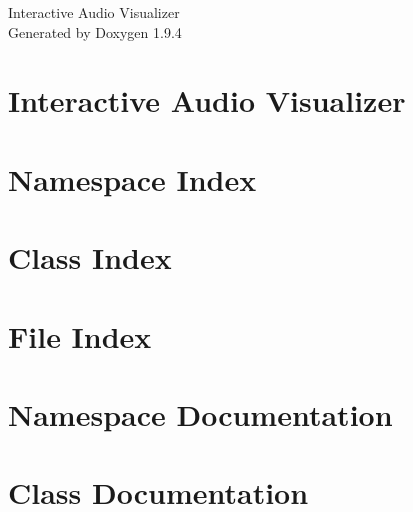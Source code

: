 \documentclass[twoside]{book}
\newcommand{\+}{\discretionary{\mbox{\scriptsize$\hookleftarrow$}}{}{}}
\newcommand{\clearemptydoublepage}{%
    \newpage{\pagestyle{empty}\cleardoublepage}%
  }
\begin{document}
  \raggedbottom
    \hypersetup{pageanchor=false,
                bookmarksnumbered=true,
                pdfencoding=unicode
               }
  \begin{titlepage}
  \vspace*{7cm}
  \begin{center}%
  {\Large Interactive Audio Visualizer}\\
  \vspace*{1cm}
  {\large Generated by Doxygen 1.9.4}\\
  \end{center}
  \end{titlepage}
  \clearemptydoublepage
  \tableofcontents
  \clearemptydoublepage
  \hypersetup{pageanchor=true}
\chapter{Interactive Audio Visualizer}
\label{index}\hypertarget{index}{}
\chapter{Namespace Index}

\chapter{Class Index}

\chapter{File Index}

\chapter{Namespace Documentation}



\chapter{Class Documentation}























\end{document}
